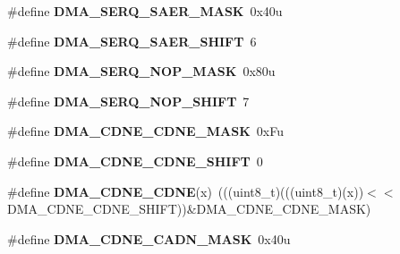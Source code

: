 \begin{DoxyCompactItemize}
\item 
\#define {\bfseries D\+M\+A\+\_\+\+S\+E\+R\+Q\+\_\+\+S\+A\+E\+R\+\_\+\+M\+A\+SK}~0x40u\hypertarget{group__DMA__Register__Masks_gad102371be9a2c3a971988f98297f85eb}{}\label{group__DMA__Register__Masks_gad102371be9a2c3a971988f98297f85eb}

\item 
\#define {\bfseries D\+M\+A\+\_\+\+S\+E\+R\+Q\+\_\+\+S\+A\+E\+R\+\_\+\+S\+H\+I\+FT}~6\hypertarget{group__DMA__Register__Masks_ga47c6cd05ecac5d87cdd944a6a3630571}{}\label{group__DMA__Register__Masks_ga47c6cd05ecac5d87cdd944a6a3630571}

\item 
\#define {\bfseries D\+M\+A\+\_\+\+S\+E\+R\+Q\+\_\+\+N\+O\+P\+\_\+\+M\+A\+SK}~0x80u\hypertarget{group__DMA__Register__Masks_ga149895dd87ae0297478305fb26cc426e}{}\label{group__DMA__Register__Masks_ga149895dd87ae0297478305fb26cc426e}

\item 
\#define {\bfseries D\+M\+A\+\_\+\+S\+E\+R\+Q\+\_\+\+N\+O\+P\+\_\+\+S\+H\+I\+FT}~7\hypertarget{group__DMA__Register__Masks_ga2aef1400cca514fe504a0f23b53bea33}{}\label{group__DMA__Register__Masks_ga2aef1400cca514fe504a0f23b53bea33}

\item 
\#define {\bfseries D\+M\+A\+\_\+\+C\+D\+N\+E\+\_\+\+C\+D\+N\+E\+\_\+\+M\+A\+SK}~0x\+Fu\hypertarget{group__DMA__Register__Masks_ga42965bab0b0f5b27c28045c06f43d43d}{}\label{group__DMA__Register__Masks_ga42965bab0b0f5b27c28045c06f43d43d}

\item 
\#define {\bfseries D\+M\+A\+\_\+\+C\+D\+N\+E\+\_\+\+C\+D\+N\+E\+\_\+\+S\+H\+I\+FT}~0\hypertarget{group__DMA__Register__Masks_ga4993325bdeae286074e4e8eace0e19ef}{}\label{group__DMA__Register__Masks_ga4993325bdeae286074e4e8eace0e19ef}

\item 
\#define {\bfseries D\+M\+A\+\_\+\+C\+D\+N\+E\+\_\+\+C\+D\+NE}(x)~(((uint8\+\_\+t)(((uint8\+\_\+t)(x))$<$$<$D\+M\+A\+\_\+\+C\+D\+N\+E\+\_\+\+C\+D\+N\+E\+\_\+\+S\+H\+I\+FT))\&D\+M\+A\+\_\+\+C\+D\+N\+E\+\_\+\+C\+D\+N\+E\+\_\+\+M\+A\+SK)\hypertarget{group__DMA__Register__Masks_gaad52359ad6d26f38404b2fffde7f9305}{}\label{group__DMA__Register__Masks_gaad52359ad6d26f38404b2fffde7f9305}

\item 
\#define {\bfseries D\+M\+A\+\_\+\+C\+D\+N\+E\+\_\+\+C\+A\+D\+N\+\_\+\+M\+A\+SK}~0x40u\hypertarget{group__DMA__Register__Masks_gae1c134ccb3874e42a53d9294e1b1366c}{}\label{group__DMA__Register__Masks_gae1c134ccb3874e42a53d9294e1b1366c}


\end{DoxyCompactItemize}

